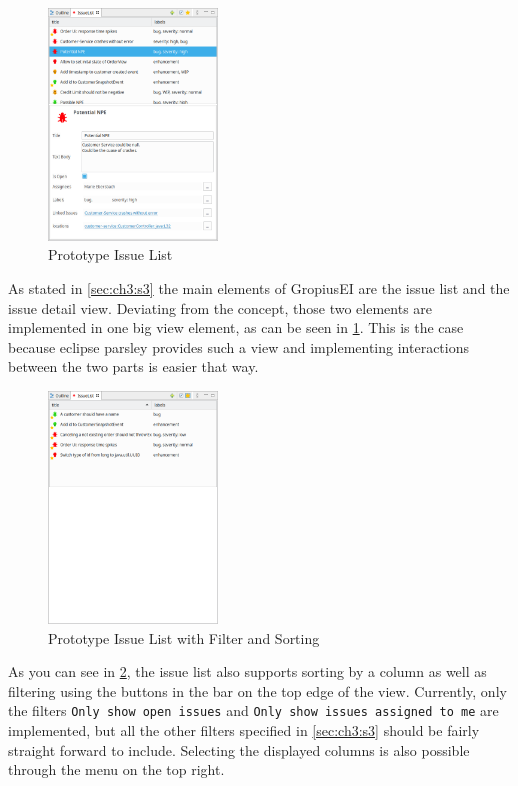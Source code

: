 \begin{figure}[!h]
	\centering
	\includegraphics[width=0.4\textwidth]{graphics/screenshot_gropius_ei_issue_list.png}
	\caption{Prototype Issue List}
	\label{fig:c4:screenshot_issue_list}
\end{figure}
As stated in \cref{sec:ch3:s3} the main elements of \gls{GropiusEI} are the issue list and the issue detail view.
Deviating from the concept, those two elements are implemented in one big view element, as can be seen in \cref{fig:c4:screenshot_issue_list}.
This is the case because eclipse parsley provides such a view and implementing interactions between the two  parts is easier that way.

\begin{figure}[!h]
	\centering
	\includegraphics[width=0.4\textwidth]{graphics/screenshot_gropius_ei_issue_list_filtered_sorted.png}
	\caption{Prototype Issue List with Filter and Sorting}
	\label{fig:c4:screenshot_issue_list_filtered_sorted}
\end{figure}
As you can see in \cref{fig:c4:screenshot_issue_list_filtered_sorted}, the issue list also supports sorting by a column as well as filtering using the buttons in the bar on the top edge of the view.
Currently, only the filters \lstinline|Only show open issues| and \lstinline|Only show issues assigned to me| are implemented, 
but all the other filters specified in \cref{sec:ch3:s3} should be fairly straight forward to include.
Selecting the displayed columns is also possible through the menu on the top right.

